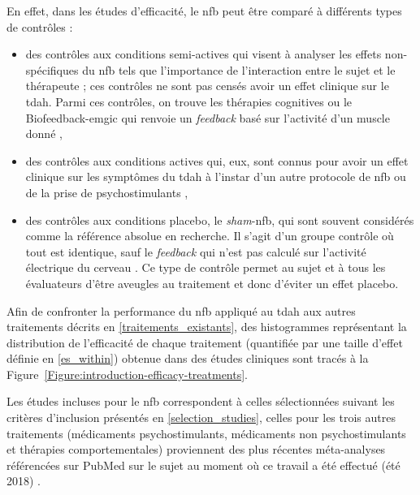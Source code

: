 En effet, dans les études d'efficacité, le \gls{nfb} peut être comparé à différents types de contrôles \citep{Arns2014} :
\begin{itemize}
\item des contrôles aux conditions semi-actives qui visent à analyser les effets non-spécifiques du \gls{nfb} tels que l'importance de l'interaction entre le sujet et le thérapeute ; 
ces contrôles ne sont pas censés avoir un effet clinique sur le \gls{tdah}. Parmi ces contrôles, on trouve les thérapies cognitives ou le Biofeedback-\gls{emgic} qui renvoie un \textit{feedback} basé
sur l'activité d'un muscle donné \citep{Bakhshayesh2011},
\item des contrôles aux conditions actives qui, eux, sont connus pour avoir un effet clinique sur les symptômes du \gls{tdah} à l'instar d'un autre protocole de \gls{nfb} \citep{Leins2007} ou
de la prise de psychostimulants \citep{Meisel2014},
\item des contrôles aux conditions placebo, le \textit{sham}-\gls{nfb}, qui sont souvent considérés comme la référence absolue en recherche. Il s'agit d'un groupe contrôle
où tout est identique, sauf le \textit{feedback} qui n'est pas calculé sur l'activité électrique du cerveau \citep{Arnold2014}. Ce type de contrôle permet 
au sujet et à tous les évaluateurs d'être aveugles au traitement et donc d'éviter un effet placebo.
\end{itemize}

Afin de confronter la performance du \gls{nfb} appliqué au \gls{tdah} aux autres traitements décrits en \ref{traitements_existants}, des histogrammes
représentant la distribution de l'efficacité de chaque traitement (quantifiée par une taille d'effet définie en \ref{es_within}) obtenue dans des études cliniques
sont tracés à la Figure~\ref{Figure:introduction-efficacy-treatments}.

Les études incluses pour le \gls{nfb} correspondent à celles sélectionnées suivant les critères d'inclusion présentés en \ref{selection_studies}, celles pour les
trois autres traitements (médicaments psychostimulants, médicaments non psychostimulants et thérapies comportementales) proviennent des plus récentes méta-analyses 
référencées sur PubMed sur le sujet au moment où ce travail a été effectué (été 2018) \citep{Luan2017, Catala2017}.

